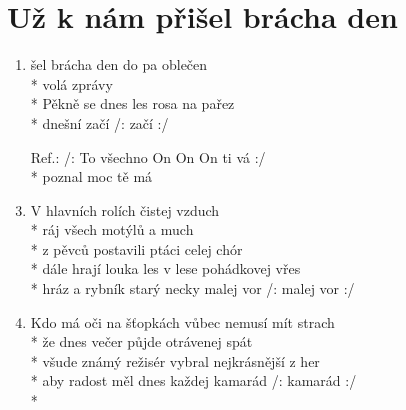 \section{Už k nám přišel brácha den}
\begin{enumerate}
\item {}  šel brácha den do pa oblečen \\*
volá   zprávy  \\*
Pěkně  se dnes les rosa  na pařez \\*
dnešní   začí /: začí :/ 
\item[Ref.:] /: To všechno  On On On ti vá :/ \\*
 poznal  moc tě má  
\item V hlavních rolích čistej vzduch \\*
ráj všech motýlů a much \\*
z pěvců postavili ptáci celej chór \\*
dále hrají louka les v lese pohádkovej vřes \\*
hráz a rybník starý necky malej vor /: malej vor :/ 
\item Kdo má oči na šťopkách vůbec nemusí mít strach \\*
že dnes večer půjde otrávenej spát \\*
všude známý režisér vybral nejkrásnější z her \\*
aby radost měl dnes každej kamarád /: kamarád :/ \\*
\end{enumerate}
